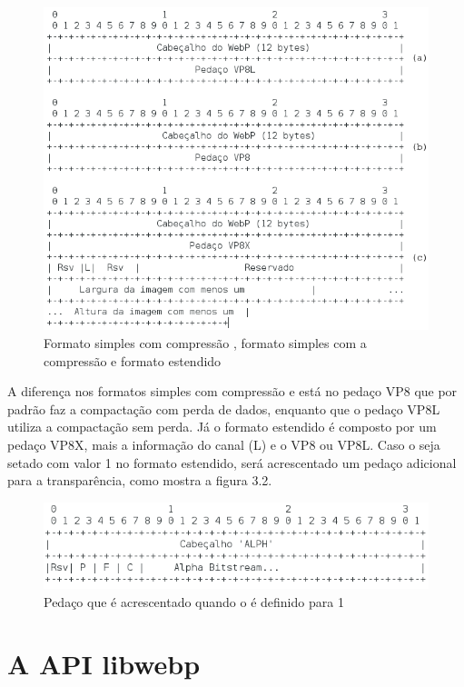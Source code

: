 \documentclass[espaco=simples,appendix=Name]{abnt}
\begin{document}
\begin{figure}[h]
  \centering
    \includegraphics[scale=0.5]{LossyLossLessExtended.png}
  \caption{Formato simples com compressão , formato simples com a compressão  e formato estendido}
\end{figure}

A diferença nos formatos simples com compressão  e  está no pedaço VP8 que por padrão faz a compactação com perda de dados, enquanto que o pedaço VP8L utiliza a compactação sem perda. Já o formato estendido é composto por um pedaço VP8X, mais a informação do canal  (L) e o  VP8 ou VP8L. Caso o  seja setado com valor 1 no formato estendido, será acrescentado um pedaço adicional para a transparência, como mostra a figura 3.2.

\begin{figure}[h]
  \centering
    \includegraphics[scale=0.4]{AlphaChunk.png}
  \caption{Pedaço que é acrescentado quando o  é definido para 1}
\end{figure}

\section{A API libwebp}
\end{document}
